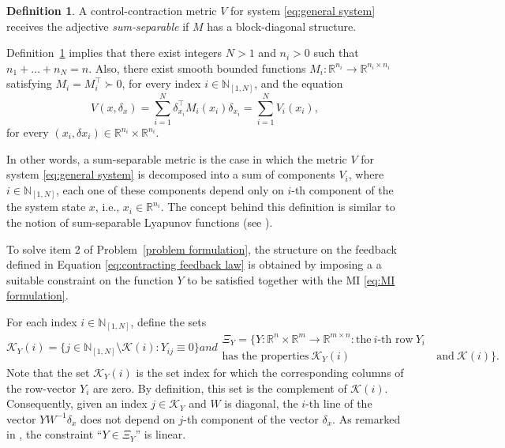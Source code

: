\documentclass[10pt,twocolumn,twoside]{IEEEtran}
\theoremstyle{plain}
\theoremstyle{definition}
\newtheorem{definition}[theorem]{Definition}
\theoremstyle{remark}
\begin{document}
\begin{definition}\label{def:SSCCM}
	A control-contraction metric $V$ for system \eqref{eq:general system} receives the adjective \emph{sum-separable} if $M$ has a block-diagonal structure. 
\end{definition}

Definition~\ref{def:SSCCM} implies that there exist integers $N>1$ and $n_i>0$ such that $n_1+\ldots+n_N=n$. Also, there exist smooth bounded functions $M_i:\mathbb{R}^{n_i}\to\mathbb{R}^{n_i\times n_i}$ satisfying $M_i=M_i^\top\succ0$, for every index $i\in\mathbb{N}_{[1,N]}$, and the equation
	\begin{equation*}
		V(x,\delta_x)=\sum_{i=1}^N \delta_{x_i}^\top M_i(x_i)\delta_{x_i}=\sum_{i=1}^N V_i(x_i),
	\end{equation*}
for every $(x_i,\delta x_i)\in\mathbb{R}^{n_i}\times\mathbb{R}^{n_i}$.

In other words, a sum-separable metric is the case in which the metric $V$ for system \eqref{eq:general system} is decomposed into a sum of components $V_i$, where $i\in\mathbb{N}_{[1,N]}$, each one of these components depend only on $i$-th component of the the system state $x$, i.e., $x_i\in\mathbb{R}^{n_i}$. The concept behind this definition is similar to the notion of sum-separable Lyapunov functions (see \cite{Dirr2015}). 

To solve item 2 of Problem~\ref{problem formulation}, the structure on the feedback defined in Equation \eqref{eq:contracting feedback law} is obtained by imposing a a suitable constraint on the function $Y$ to be satisfied together with the MI \eqref{eq:MI formulation}. 

For each index $i\in\mathbb{N}_{[1,N]}$, define the sets 
\begin{subequations}
	\begin{equation*}
		\mathscr{K}_Y(i)=\{j\in \mathbb{N}_{[1,N]}\setminus\mathscr{K}(i):Y_{ij}\equiv0\}
	\end{equation*}
	and
	\begin{align*}
		\Xi_Y=\{Y:\mathbb{R}^n\times\mathbb{R}^m\to\mathbb{R}^{m\times n}:\text{the}\ i\text{-th row}\ Y_i\ \\
		\text{has the properties}\ \mathscr{K}_Y(i)\ &\text{and}\ \mathscr{K}(i)\}.
	\end{align*}
\end{subequations}
Note that the set $\mathscr{K}_Y(i)$ is the set index for which the corresponding columns of the row-vector $Y_i$ are zero. By definition, this set is the complement of $\mathscr{K}(i)$. Consequently, given an index $j\in\mathscr{K}_Y$ and $W$ is diagonal, the $i$-th line of the vector $YW^{-1}\delta_x$ does not depend on $j$-th component of the vector $\delta_x$. As remarked in \cite{Tanaka2011}, the constraint ``$Y\in\Xi_Y$'' is linear.
\end{document}
